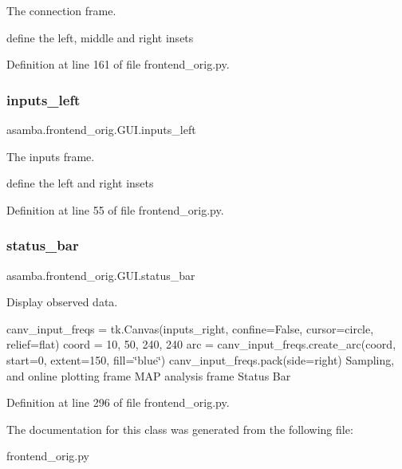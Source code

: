 The connection frame. 

define the left, middle and right insets 

Definition at line 161 of file frontend\+\_\+orig.\+py.

\mbox{\label{classasamba_1_1frontend__orig_1_1_g_u_i_a0c7f18b731c65f48e9cc27399e21363c}} 
\subsubsection{\texorpdfstring{inputs\+\_\+left}{inputs\_left}}
{\footnotesize\ttfamily asamba.\+frontend\+\_\+orig.\+G\+U\+I.\+inputs\+\_\+left}



The inputs frame. 

define the left and right insets 

Definition at line 55 of file frontend\+\_\+orig.\+py.

\mbox{\label{classasamba_1_1frontend__orig_1_1_g_u_i_a740ec5fcacbc2e7b4fa0ea061b52d411}} 
\subsubsection{\texorpdfstring{status\+\_\+bar}{status\_bar}}
{\footnotesize\ttfamily asamba.\+frontend\+\_\+orig.\+G\+U\+I.\+status\+\_\+bar}



Display observed data. 

canv\+\_\+input\+\_\+freqs = tk.\+Canvas(inputs\+\_\+right, confine=False, cursor=\textquotesingle{}circle\textquotesingle{}, relief=\textquotesingle{}flat\textquotesingle{}) coord = 10, 50, 240, 240 arc = canv\+\_\+input\+\_\+freqs.\+create\+\_\+arc(coord, start=0, extent=150, fill=\char`\"{}blue\char`\"{}) canv\+\_\+input\+\_\+freqs.\+pack(side=\textquotesingle{}right\textquotesingle{}) Sampling, and online plotting frame M\+AP analysis frame Status Bar 

Definition at line 296 of file frontend\+\_\+orig.\+py.



The documentation for this class was generated from the following file\+:\begin{DoxyCompactItemize}
\item 
frontend\+\_\+orig.\+py\end{DoxyCompactItemize}
